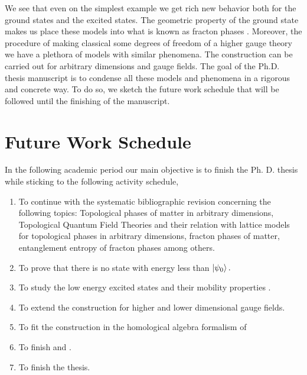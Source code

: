 \documentclass[titlepage,11pt]{article}
\theoremstyle{plain}%
\theoremstyle{definition}
\theoremstyle{remark}
\begin{document}
We see that even on the simplest example we get rich new behavior both for the ground states and the excited states. The geometric property of the ground state makes us place these models into what is known as fracton phases \cite{chamon05,rahul18}. Moreover, the procedure of making classical some degrees of freedom  of a higher gauge theory we have a plethora of models with similar phenomena. The construction can be carried out for arbitrary dimensions and gauge fields. The goal of the Ph.D. thesis manuscript is to condense all these models and phenomena in a rigorous and concrete way. To do so, we sketch the future work schedule that will be followed until the finishing of the manuscript.


\section{Future Work Schedule}
In the following academic period our main objective is to finish the Ph. D. thesis while sticking to the following activity schedule, 
\begin{enumerate}
\item To continue with the systematic bibliographic revision concerning the following topics: Topological phases of matter in arbitrary dimensions, Topological Quantum Field Theories and their relation with lattice models for topological phases in arbitrary dimensions, fracton phases of matter, entanglement entropy of fracton phases among others.
\item To prove that there is no state with energy less than $\ket{\psi_0}.$
\item To study the low energy excited states and their mobility properties .
\item To extend the construction for higher and lower dimensional gauge fields.
\item To fit the construction in the homological algebra formalism of \cite{higher}
\item To finish \cite{higher} and \cite{pablo}.
\item To finish the thesis.

\end{enumerate}
\end{document}
